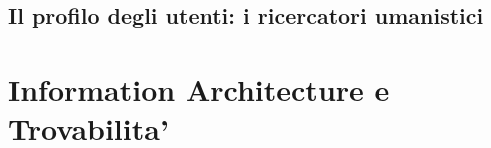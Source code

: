 \subsection{Il profilo degli utenti: i ricercatori umanistici}
\label{subsec:utenti}
%
%
%
%


\section{Information Architecture e Trovabilita'}
\label{sec:ia}
%
%

